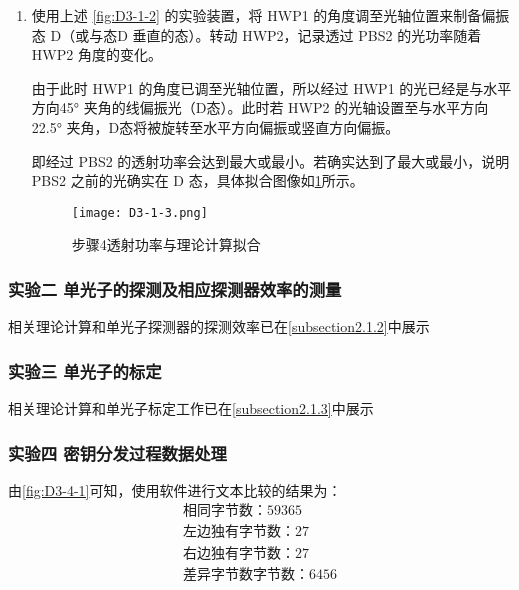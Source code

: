 \documentclass[dvipsnames, svgnames,a4paper,11pt]{article}
\begin{document}
\begin{enumerate}
			\item 使用上述 \cref{fig:D3-1-2} 的实验装置，将 HWP1 的角度调至光轴位置来制备偏振态 D（或与态D 垂直的态）。转动 HWP2，记录透过 PBS2 的光功率随着 HWP2 角度的变化。 

			由于此时 HWP1 的角度已调至光轴位置，所以经过 HWP1 的光已经是与水平方向45° 夹角的线偏振光（D态）。此时若 HWP2 的光轴设置至与水平方向 22.5° 夹角，D态将被旋转至水平方向偏振或竖直方向偏振。
			
			即经过 PBS2 的透射功率会达到最大或最小。若确实达到了最大或最小，说明 PBS2 之前的光确实在 D 态，具体拟合图像如\cref{fig:D3-1-3}所示。

			\begin{figure}[H]
				\centering
				\texttt{[image: D3-1-3.png]}
				\caption{步骤4透射功率与理论计算拟合}
				\label{fig:D3-1-3}
			\end{figure}
			
		\end{enumerate}

			
















	\subsubsection{实验二 \quad 单光子的探测及相应探测器效率的测量}

		相关理论计算和单光子探测器的探测效率已在\cref{subsection2.1.2}中展示


	\subsubsection{实验三 \quad 单光子的标定}

		相关理论计算和单光子标定工作已在\cref{subsection2.1.3}中展示



	\subsubsection{实验四 \quad 密钥分发过程数据处理}


		由\cref{fig:D3-4-1}可知，使用软件进行文本比较的结果为：
			\begin{align}
				\text{相同字节数：} 59365	\nonumber\\
				\text{左边独有字节数：} 27	\nonumber\\
				\text{右边独有字节数：} 27	\nonumber\\
				\text{差异字节数字节数：} 6456	\nonumber
			\end{align}
			
\end{document}
